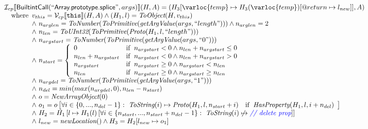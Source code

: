 \[\begin{array}{l}
\I _{cp}\lbr \SF{BuiltintCall}(``\SF{Array.prototype.splice}",args)\rbr(H,A)
 = (H_3[\varloc{temp}\mapsto H_3(\varloc{temp})[\varprop{return}\mapsto l_{new}]], A) \\
\quad\wherec{
  v_{this} = \V _{cp}\lbr \TT{this}\rbr (H,A) \land (H_1,l) = \hf{ToObject}(H,v_{this})\\
  \land\ n_{arglen} = \hf{ToNumber}(\hf{ToPrimitive}(\hf{getArgValue}(args, ``length")))
  \land n_{arglen} = 2\\
  \land\ n_{len} = \hf{ToUInt32}(\hf{ToPrimitive}(\hf{Proto}(H_1, l, ``length")))\\
  \land\ n_{argstart} = \hf{ToNumber}(\hf{ToPrimitive}(\hf{getArgValue}(args, ``0")))\\
  \land\ n_{start} = \left\{\begin{array}{ll}
      0 & \ifc{n_{argstart} < 0 \land n_{len} + n_{argstart} \leq 0}\\
      n_{len} + n_{argstart} & \ifc{n_{argstart} < 0 \land n_{len} + n_{argstart} > 0}\\
      n_{argstart} & \ifc{n_{argstart} \geq 0 \land n_{argstart} < n_{len}}\\
      n_{len}  & \ifc{n_{argstart} \geq 0 \land n_{argstart} \geq n_{len}}\\
    \end{array}\right.\\
  \land\ n_{argdel} = \hf{ToNumber}(\hf{ToPrimitive}(\hf{getArgValue}(args, ``1")))\\
  \land\ n_{del} = min(max(n_{argdel}, 0), n_{len} - n_{start})\\
  \land\ o = \hf{NewArrayObject}(0)\\
  \land\ o_1 = o\left[\forall i \in \{0,...,n_{del}-1\}: \
    \hf{ToString}(i) \mapsto \hf{Proto}(H_1, l, n_{start}+i)
    \quad\ifc{\hf{HasProperty}(H_1, l, i+n_{del})}\right]\\
  \land\ H_2 = H_1\left[l \mapsto H_1(l)\left[\forall i \in \{n_{start},...,n_{start}+n_{del}-1\}: \
    \hf{ToString}(i) \not\mapsto  \comment{{\inblue // delete prop}}\right]\right]\\
  \land\ l_{new} = \hf{newLocation}() \land H_3 = H_2[l_{new} \mapsto o_1]
  }\\
  
\end{array}
\]

